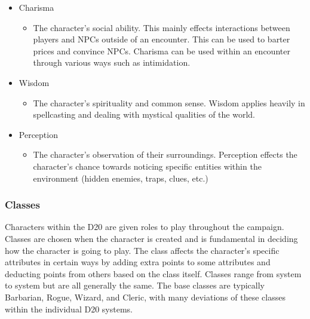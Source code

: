 \documentclass[12pt,a4paper]{report}
\begin{document}
\begin{itemize}
\begin{itemize}
			\end{itemize}
			\item Charisma
			\begin{itemize}
				\item The character's social ability. This mainly effects interactions between players and NPCs outside of an encounter. This can be used to barter prices and convince NPCs. Charisma can be used within an encounter through various ways such as intimidation. 
			\end{itemize}
			\item Wisdom
			\begin{itemize}
				\item The character's spirituality and common sense. Wisdom applies heavily in spellcasting and dealing with mystical qualities of the world. 
			\end{itemize}
			\item Perception
			\begin{itemize}
				\item The character's observation of their surroundings. Perception effects the character's chance towards noticing specific entities within the environment (hidden enemies, traps, clues, etc.)
			\end{itemize}
		\end{itemize}
		\newpage
		\subsubsection{Classes}
			Characters within the D20 are given roles to play throughout the campaign. Classes are chosen when the character is created and is fundamental in deciding how the character is going to play. The class affects the character's specific attributes in certain ways by adding extra points to some attributes and deducting points from others based on the class itself. Classes range from system to system but are all generally the same. The base classes are typically Barbarian, Rogue, Wizard, and Cleric, with many deviations of these classes within the individual D20 systems.
\end{document}
